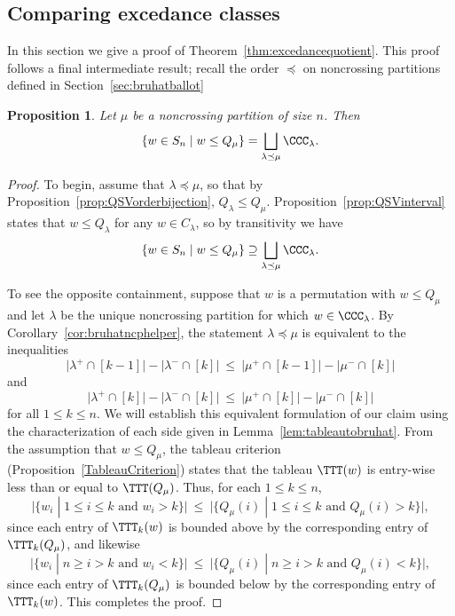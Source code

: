 \documentclass[12pt]{amsart}
\newtheorem{prop}[equation]{Proposition}
\theoremstyle{definition}
\theoremstyle{remark}
\numberwithin{equation}{section}
\begin{document}
\subsection{Comparing excedance classes}
\label{sec:ex3}

In this section we give a proof of Theorem~\ref{thm:excedancequotient}.  This proof follows a final intermediate result; recall the order $\preceq$ on noncrossing partitions defined in Section~\ref{sec:bruhatballot}

\begin{prop}
\label{prop:Qdominates}
Let $\mu$ be a noncrossing partition of size $n$.  Then
\[
\{w \in S_{n} \;|\; w \le Q_{\mu}\} = \bigsqcup_{\lambda \preceq \mu} \CCC_{\lambda}.
\]
\end{prop}
\begin{proof}
To begin, assume that $\lambda \preceq \mu$, so that by Proposition~\ref{prop:QSVorderbijection}, $Q_{\lambda} \le Q_{\mu}$.  Proposition~\ref{prop:QSVinterval} states that $w \le Q_{\lambda}$ for any $w \in C_{\lambda}$, so by transitivity we have
\[
\{w \in S_{n} \;|\; w \le Q_{\mu}\} \supseteq \bigsqcup_{\lambda \preceq \mu} \CCC_{\lambda}.
\]

To see the opposite containment, suppose that $w$ is a permutation with $w \le Q_{\mu}$ and let $\lambda$ be the unique noncrossing partition for which $w \in \CCC_{\lambda}$.  
By Corollary~\ref{cor:bruhatncphelper}, the statement $\lambda \preceq \mu$ is equivalent to the inequalities
\[
\big|\lambda^{+} \cap [k-1]\big| - \big|\lambda^{-} \cap [k]\big| \  \le\   \big|\mu^{+} \cap [k-1]\big| - |\mu^{-} \cap [k]\big|
\]
and
\[
\big|\lambda^{+} \cap [k]\big| - \big|\lambda^{-} \cap [k]\big|\  \le \  \big|\mu^{+} \cap [k]\big| - \big|\mu^{-} \cap [k]\big|
\]
for all $1 \le k \le n$.  
We will establish this equivalent formulation of our claim using the characterization of each side given in Lemma~\ref{lem:tableautobruhat}.  
From the assumption that $w \le Q_{\mu}$, the tableau criterion (Proposition~\ref{TableauCriterion}) states that the tableau $\TTT(w)$ is entry-wise less than or equal to $\TTT(Q_{\mu})$.  
Thus, for each $1 \le k \le n$, 
\[
\big|\{w_{i} \;|\; \text{$1 \le i \le k$ and $w_{i} > k$} \}\big|
\ \le\ 
\big|\{Q_{\mu}(i) \;|\; \text{$1 \le i \le k$ and $Q_{\mu}(i) > k$} \}\big|,
\]
since each entry of $\TTT_{k}(w)$ is bounded above by the corresponding entry of $\TTT_{k}(Q_{\mu})$, and likewise
\[
\big|\{ w_{i} \;|\; \text{$n \ge i > k$ and $w_{i} < k$} \}\big| 
\ \le\ 
\big|\{ Q_{\mu}(i) \;|\; \text{$n \ge i > k$ and $Q_{\mu}(i) < k$} \}\big|,
\]
since each entry of $\TTT_{k}(Q_{\mu})$ is bounded below by the corresponding entry of $\TTT_{k}(w)$.  This completes the proof.
\end{proof}
\end{document}

